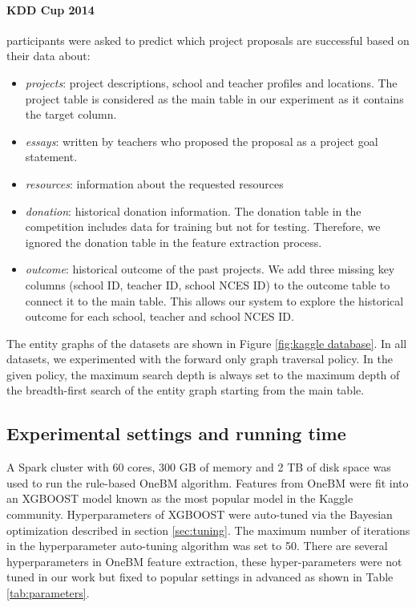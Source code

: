\paragraph{KDD Cup 2014} participants were asked to predict which project proposals are successful based on their data about:
\begin{itemize}
\item \textit{projects}:   project descriptions, school and teacher profiles and locations. The project table is considered as the main table in our experiment as it contains the target column.
\item \textit{essays}: written by teachers who proposed the proposal as a project goal statement.
\item \textit{resources}: information about the requested resources
\item \textit{donation}:  historical donation information. The donation table in the competition  includes data for training but not for testing. Therefore, we ignored the donation table in the feature extraction process.
\item \textit{outcome}: historical outcome of the past projects. We add three missing key columns (school ID, teacher ID, school NCES ID) to the outcome table to connect it to the main table. This allows our system to explore the historical outcome for each school, teacher and school NCES ID.
\end{itemize} 
 The entity graphs of the datasets are shown in Figure \ref{fig:kaggle database}. In all datasets, we experimented with the forward only graph traversal policy. In the given policy, the maximum search depth is always set  to the maximum depth of the breadth-first search of the entity graph starting from the main table. 
 


\subsection{Experimental settings and running time}
A Spark cluster with 60 cores, 300 GB of memory and 2 TB of disk space was used to run the rule-based OneBM algorithm. Features from OneBM were fit into an XGBOOST model known as the most popular model in the Kaggle community. Hyperparameters of XGBOOST were auto-tuned via the Bayesian optimization described in section \ref{sec:tuning}. The maximum number of iterations in the hyperparameter auto-tuning algorithm was set to 50. There are several hyperparameters in OneBM feature extraction, these hyper-parameters were not tuned in our work but fixed to popular settings \cite{dlbook} in advanced as shown in Table \ref{tab:parameters}. 

